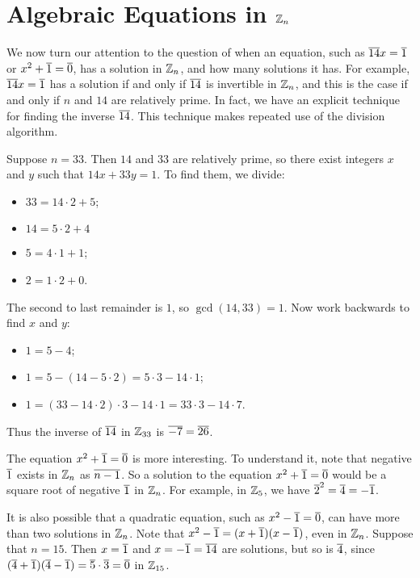 \documentclass{amsart}
\begin{document}
\newpage

\section{Algebraic Equations in $\mathbb{Z}_{n}$}

We now turn our attention to the question of when an equation,
such as $\overline{14}x = \overline{1}$ or $x^{2}+\overline{1} = \overline{0}$, has a solution in $\mathbb{Z}_{n}$,
and how many solutions it has.
For example, $\overline{14}x = \overline{1}$ has a solution if and only if $\overline{14}$ is invertible
in $\mathbb{Z}_{n}$, and this is the case if and only if $n$ and $14$
are relatively prime.  In fact, we have an explicit technique for
finding the inverse $\overline{14}$.  This technique makes repeated use of
the division algorithm.

Suppose $n = 33$.  Then $14$ and $33$ are relatively prime,
so there exist integers $x$ and $y$ such that $14x  + 33y = 1$.
To find them, we divide:
\begin{itemize}
\item $33 = 14 \cdot 2 + 5$;
\item $14 = 5 \cdot 2 + 4$
\item $5 = 4 \cdot 1 + 1$;
\item $2 = 1 \cdot 2 + 0$.
\end{itemize}

The second to last remainder is $1$, so $\gcd(14,33) = 1$.
Now work backwards to find $x$ and $y$:
\begin{itemize}
\item $1 = 5 - 4$;
\item $1 = 5 - (14-5 \cdot 2) = 5 \cdot 3 - 14 \cdot 1$;
\item $1 = (33 - 14 \cdot 2) \cdot 3 - 14 \cdot 1 = 33 \cdot 3 - 14 \cdot 7$.
\end{itemize}

Thus the inverse of $\overline{14}$ in $\mathbb{Z}_{33}$ is $\overline{-7} = \overline{26}$.

The equation $x^{2}+\overline{1} = \overline{0}$
is more interesting.  To understand it, note
that negative $\overline{1}$ exists in $\mathbb{Z}_{n}$ as $\overline{n-1}$.
So a solution to the equation $x^{2} + \overline{1} = \overline{0}$ would be a square root of
negative $\overline{1}$ in $\mathbb{Z}_{n}$.
For example, in $\mathbb{Z}_{5}$, we have $\overline{2}^{2} = \overline{4} = -\overline{1}$.

It is also possible that a quadratic equation, such as $x^{2} - \overline{1} = \overline{0}$,
can have more than two solutions in $\mathbb{Z}_{n}$.
Note that $x^{2} - \overline{1} = (x+\overline{1})(x-\overline{1})$, even in $\mathbb{Z}_{n}$.
Suppose that $n = 15$.
Then $x = \overline{1}$ and $x = -\overline{1} = \overline{14}$ are solutions, but so is $\overline{4}$,
since $(\overline{4}+\overline{1})(\overline{4}-\overline{1}) = \overline{5} \cdot \overline{3} = \overline{0}$ in $\mathbb{Z}_{15}$.
\end{document}
